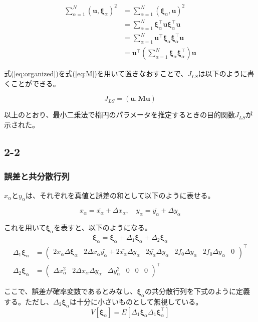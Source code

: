 \documentclass[12pt,a4j]{jsarticle}
\newcommand{\xa}{x_\alpha}
\newcommand{\ya}{y_\alpha}
\newcommand{\xia}{\bm{\xi}_\alpha}
\begin{document}
  \begin{align}
    \sum_{\alpha = 1}^N (\bm{u}, \xia)^2 &= \sum_{\alpha = 1}^N (\xia, \bm{u})^2 \nonumber \\
     &= \sum_{\alpha = 1}^N \xia^\top \bm{u} \xia^\top \bm{u} \nonumber \\
     &= \sum_{\alpha = 1}^N \bm{u}^\top \xia \xia^\top \bm{u} \nonumber \\
     &= \bm{u}^\top \left(\sum_{\alpha = 1}^N \xia \xia^\top \right) \bm{u} \label{eq:organized}
  \end{align}

  式(\ref{eq:organized})を式(\ref{eq:M})を用いて置きなおすことで、$J_{LS}$は以下のように書くことができる。

  \begin{equation}
    J_{LS} = (\bm{u}, \bm{Mu})
  \end{equation}

  以上のとおり、最小二乗法で楕円のパラメータを推定するときの目的関数$J_{LS}$が示された。

  \subsection*{2-2}
    \subsubsection*{誤差と共分散行列}
      $\xa$と$\ya$は、それぞれを真値と誤差の和として以下のように表せる。

      \begin{equation}
        \xa = \bar{\xa} + \Delta \xa, \quad \ya = \bar{\ya} + \Delta \ya
      \end{equation}

      これを用いて$\xia$を表すと、以下のようになる。
      \begin{equation}
        \xia = \bar{\xia} + \Delta_1\xia + \Delta_2\xia
      \end{equation}
      \begin{align}
        \Delta_1\xia &= \begin{pmatrix}2\xa\Delta\xia & 2\Delta\xa\bar{\ya} + 2\bar{\xa}\Delta\ya & 2\bar{\ya}\Delta\ya & 2f_0\Delta\ya & 2f_0\Delta\ya & 0\end{pmatrix}^\top \\
        \Delta_2\xia &= \begin{pmatrix}\Delta\xa^2 & 2\Delta\xa\Delta\ya & \Delta\ya^2 & 0 & 0 & 0 \end{pmatrix}^\top
      \end{align}

      ここで、誤差が確率変数であるとみなし、$\xia$の共分散行列を下式のように定義する。ただし、$\Delta_2\xia$は十分に小さいものとして無視している。
      \begin{equation}
        V[\xia] = E[\Delta_1\xia\Delta_1\xia^\top]
      \end{equation}
\end{document}
